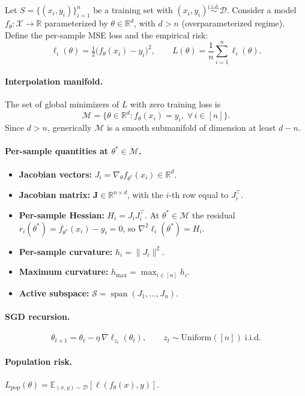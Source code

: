 \documentclass[11pt,a4paper]{article}
\theoremstyle{definition}
\theoremstyle{remark}
\DeclareMathOperator{\spn}{span}
\newcommand{\R}{\mathbb{R}}
\newcommand{\E}{\mathbb{E}}
\newcommand{\cM}{\mathcal{M}}
\newcommand{\cS}{\mathcal{S}}
\newcommand{\cX}{\mathcal{X}}
\newcommand{\cD}{\mathcal{D}}
\newcommand{\bJ}{\mathbf{J}}
\begin{document}
Let $S = \{(x_i, y_i)\}_{i=1}^n$ be a training set with
$(x_i, y_i) \stackrel{\text{i.i.d.}}{\sim} \cD$.
Consider a model $f_\theta \colon \cX \to \R$ parameterized by
$\theta \in \R^d$, with $d > n$ (overparameterized regime).
Define the per-sample MSE loss and the empirical risk:
\[
  \ell_i(\theta) = \tfrac{1}{2}\bigl(f_\theta(x_i) - y_i\bigr)^2,
  \qquad
  L(\theta) = \frac{1}{n}\sum_{i=1}^n \ell_i(\theta).
\]

\paragraph{Interpolation manifold.}
The set of global minimizers of $L$ with zero training loss is
\[
  \cM = \bigl\{\theta \in \R^d : f_\theta(x_i) = y_i,\;\forall\, i \in [n]\bigr\}.
\]
Since $d > n$, generically $\cM$ is a smooth submanifold of dimension at least $d - n$.

\paragraph{Per-sample quantities at $\theta^* \in \cM$.}
\begin{itemize}[leftmargin=2em]
  \item \textbf{Jacobian vectors:} $J_i = \nabla_\theta f_{\theta^*}(x_i) \in \R^d$.
  \item \textbf{Jacobian matrix:} $\bJ \in \R^{n \times d}$, with the $i$-th row
    equal to $J_i^\top$.
  \item \textbf{Per-sample Hessian:}
    $H_i = J_i J_i^\top$.
    At $\theta^* \in \cM$ the residual $r_i(\theta^*) = f_{\theta^*}(x_i) - y_i = 0$,
    so $\nabla^2 \ell_i(\theta^*) = H_i$.
  \item \textbf{Per-sample curvature:} $h_i = \|J_i\|^2$.
  \item \textbf{Maximum curvature:} $h_{\max} = \max_{i \in [n]} h_i$.
  \item \textbf{Active subspace:} $\cS = \spn(J_1, \ldots, J_n)$.
\end{itemize}

\paragraph{SGD recursion.}
\[
  \theta_{t+1} = \theta_t - \eta\,\nabla\ell_{z_t}(\theta_t),
  \qquad z_t \sim \mathrm{Uniform}([n]) \;\text{i.i.d.}
\]

\paragraph{Population risk.}
$L_{\mathrm{pop}}(\theta) = \E_{(x,y)\sim\cD}[\ell(f_\theta(x), y)]$.
\end{document}
